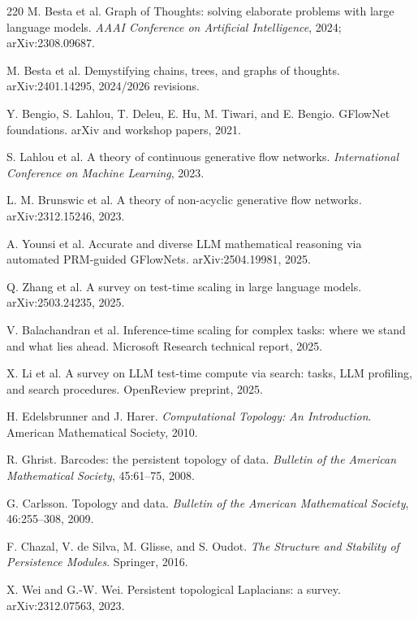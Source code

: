 \documentclass[11pt]{article}
\newcommand{\1}{\mathbf{1}}
\begin{document}
\begin{thebibliography}{220}
M. Besta et al. Graph of Thoughts: solving elaborate problems with large language models. \emph{AAAI Conference on Artificial Intelligence}, 2024; arXiv:2308.09687.

M. Besta et al. Demystifying chains, trees, and graphs of thoughts. arXiv:2401.14295, 2024/2026 revisions.

Y. Bengio, S. Lahlou, T. Deleu, E. Hu, M. Tiwari, and E. Bengio. GFlowNet foundations. arXiv and workshop papers, 2021.

S. Lahlou et al. A theory of continuous generative flow networks. \emph{International Conference on Machine Learning}, 2023.

L. M. Brunswic et al. A theory of non-acyclic generative flow networks. arXiv:2312.15246, 2023.

A. Younsi et al. Accurate and diverse LLM mathematical reasoning via automated PRM-guided GFlowNets. arXiv:2504.19981, 2025.

Q. Zhang et al. A survey on test-time scaling in large language models. arXiv:2503.24235, 2025.

V. Balachandran et al. Inference-time scaling for complex tasks: where we stand and what lies ahead. Microsoft Research technical report, 2025.

X. Li et al. A survey on LLM test-time compute via search: tasks, LLM profiling, and search procedures. OpenReview preprint, 2025.

H. Edelsbrunner and J. Harer. \emph{Computational Topology: An Introduction}. American Mathematical Society, 2010.

R. Ghrist. Barcodes: the persistent topology of data. \emph{Bulletin of the American Mathematical Society}, 45:61--75, 2008.

G. Carlsson. Topology and data. \emph{Bulletin of the American Mathematical Society}, 46:255--308, 2009.

F. Chazal, V. de Silva, M. Glisse, and S. Oudot. \emph{The Structure and Stability of Persistence Modules}. Springer, 2016.

X. Wei and G.-W. Wei. Persistent topological Laplacians: a survey. arXiv:2312.07563, 2023.


\end{thebibliography}
\end{document}

